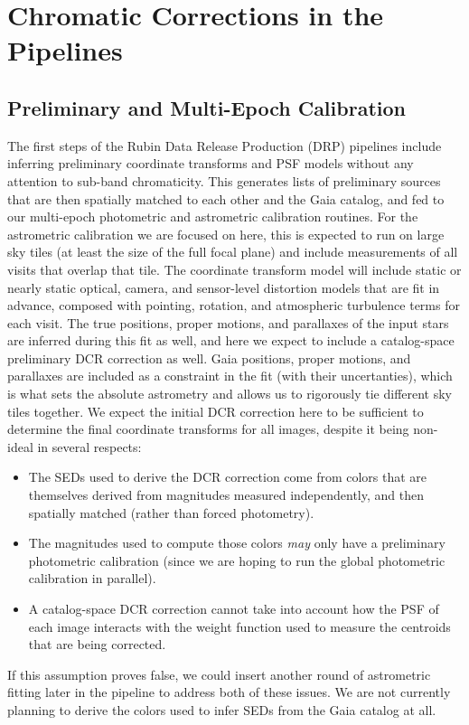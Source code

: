 \documentclass[DM,authoryear,toc]{lsstdoc}
\begin{document}
\section{Chromatic Corrections in the Pipelines}

\subsection{Preliminary and Multi-Epoch Calibration}

The first steps of the Rubin Data Release Production (DRP) pipelines include inferring preliminary coordinate transforms and PSF models without any attention to sub-band chromaticity.
This generates lists of preliminary sources that are then spatially matched to each other and the Gaia catalog, and fed to our multi-epoch photometric and astrometric calibration routines.
For the astrometric calibration we are focused on here, this is expected to run on large sky tiles (at least the size of the full focal plane) and include measurements of all visits that overlap that tile.
The coordinate transform model will include static or nearly static optical, camera, and sensor-level distortion models that are fit in advance, composed with pointing, rotation, and atmospheric turbulence terms for each visit.
The true positions, proper motions, and parallaxes of the input stars are inferred during this fit as well, and here we expect to include a catalog-space preliminary DCR correction as well.
Gaia positions, proper motions, and parallaxes are included as a constraint in the fit (with their uncertanties), which is what sets the absolute astrometry and allows us to rigorously tie different sky tiles together.
We expect the initial DCR correction here to be sufficient to determine the final coordinate transforms for all images, despite it being non-ideal in several respects:
\begin{itemize}
  \item The SEDs used to derive the DCR correction come from colors that are themselves derived from magnitudes measured independently, and then spatially matched (rather than forced photometry).
  \item The magnitudes used to compute those colors \emph{may} only have a preliminary photometric calibration (since we are hoping to run the global photometric calibration in parallel).
  \item A catalog-space DCR correction cannot take into account how the PSF of each image interacts with the weight function used to measure the centroids that are being corrected.
\end{itemize}
If this assumption proves false, we could insert another round of astrometric fitting later in the pipeline to address both of these issues.
We are not currently planning to derive the colors used to infer SEDs from the Gaia catalog at all.
\end{document}
